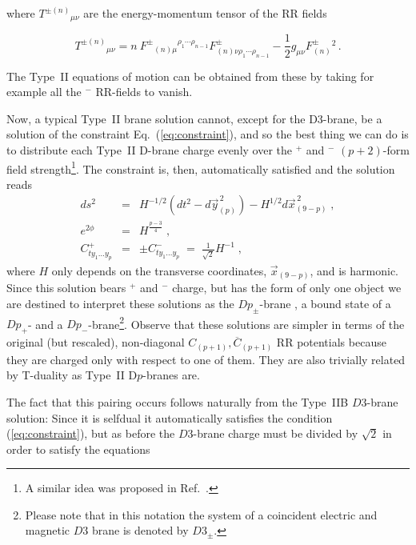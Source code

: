 \documentclass[12pt,a4paper]{article}
\begin{document}
\noindent where $T^{\pm (n)}{}_{\mu\nu}$ are the energy-momentum tensor
of the RR fields

\begin{equation}
T^{\pm (n)}{}_{\mu\nu} = n\ F^{\pm}{}_{(n)\mu}{}^{\rho_{1}\cdots\rho_{n-1}}
F^{\pm}_{(n)\nu\rho_{1}\cdots\rho_{n-1}}
-{\textstyle\frac{1}{2}} g_{\mu\nu} F^{\pm}_{(n)}{}^{2}\, .
\end{equation}

\noindent The Type~II equations of motion can be obtained from these
by taking for example all the $^{-}$ RR-fields to vanish.

Now, a typical Type~II brane solution cannot, except for the D3-brane,
be a solution of the constraint Eq.~(\ref{eq:constraint}), and so the
best thing we can do is to distribute each Type~II D-brane charge
evenly over the $^{+}$ and $^{-}$ $(p+2)$-form field
strength\footnote{A similar idea was proposed in
  Ref.~\cite{Armoni:1999gc}.}. The constraint is, then, automatically
satisfied and the solution reads
\begin{eqnarray}
  \label{eq:0_D-braneSol}
  ds^{2} &=& H^{-1/2}\left( dt^{2}-d\vec{y}^{\, 2}_{(p)} \right)
               -H^{1/2}d\vec{x}_{(9-p)}^{\, 2} \; ,\nonumber \\
  e^{2\phi} &=& H^{\frac{p-3}{4}} \; ,\nonumber \\
  C^{+}_{ty_{1}\ldots y_{p}} &=& \pm C^{-}_{ty_{1}\ldots y_{p}} \;=\;
                                 \textstyle{\frac{1}{\sqrt{2}}}H^{-1} \; ,
\end{eqnarray}
where $H$ only depends on the transverse coordinates,
$\vec{x}_{(9-p)}$, and is harmonic.  Since this solution bears $^{+}$
and $^{-}$ charge, but has the form of only one object we are destined
to interpret these solutions as the $Dp_{\pm}$-brane \cite{kn:costa},
a bound state of a $Dp_{+}$- and a $Dp_{-}$-brane\footnote{Please note
  that in this notation the system of a coincident electric and
  magnetic $D3$ brane \cite{kn:KlTs3} is denoted by $D3_{\pm}$.}.
Observe that these solutions are simpler in terms of the original (but
rescaled), non-diagonal $C_{(p+1)},\overline{C}_{(p+1)}$ RR potentials
because they are charged only with respect to one of them.  They are
also trivially related by T-duality as Type~II D$p$-branes are.
\par
The fact that this pairing occurs follows naturally from the Type~IIB
$D3$-brane solution: Since it is selfdual it automatically satisfies
the condition (\ref{eq:constraint}), but as before the $D3$-brane
charge must be divided by $\sqrt{2}$ in order to satisfy the equations
\end{document}
